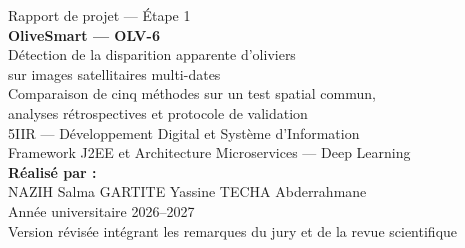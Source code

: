 \documentclass[10pt,a4paper,twocolumn]{article}
\begin{document}
\onecolumn
\thispagestyle{empty}
\begin{center}
\vspace*{1.5cm}
{\large Rapport de projet --- Étape 1}\\[1.2cm]
{\Huge\bfseries\color{olive} OliveSmart --- OLV-6}\\[0.8cm]
{\LARGE Détection de la disparition apparente d'oliviers\\[0.2cm] sur images satellitaires multi-dates}\\[0.6cm]
{\large Comparaison de cinq méthodes sur un test spatial commun,\\ analyses rétrospectives et protocole de validation}\\[2.2cm]
{\large 5IIR --- Développement Digital et Système d'Information}\\[0.2cm]
{\large Framework J2EE et Architecture Microservices --- Deep Learning}\\[2.2cm]
{\large\bfseries Réalisé par :}\\[0.3cm]
{\large NAZIH Salma \quad GARTITE Yassine \quad TECHA Abderrahmane}\\[2.5cm]
{\large Année universitaire 2026--2027}\\[0.4cm]
{\normalsize Version révisée intégrant les remarques du jury et de la revue scientifique}
\end{center}
\clearpage
\twocolumn
\setcounter{page}{2}
\end{document}
